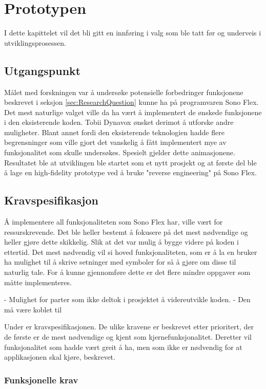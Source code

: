 \chapter{Prototypen} 

I dette kapittelet vil det bli gitt en innføring i valg som ble tatt før og underveis i utviklingsprosessen. 
 
\section{Utgangspunkt} 
\label{sec:utgangspunkt} 

Målet med forskningen var å undersøke potensielle forbedringer funksjonene beskrevet i seksjon \ref{sec:ResearchQuestion} kunne ha på programvaren Sono Flex. Det mest naturlige valget ville da  ha vært å implementert de ønskede funksjonene i den eksisterende koden. Tobii Dynavox ønsket derimot å utforske andre muligheter. Blant annet fordi den eksisterende teknologien hadde flere begrensninger som ville gjort det vanskelig å fått implementert mye av funksjonalitet som skulle undersøkes. Spesielt gjelder dette animasjonene. Resultatet ble at utviklingen ble startet som et nytt prosjekt og at første del ble å lage en high-fidelity prototype ved å bruke "reverse engineering" på Sono Flex.


\section{Kravspesifikasjon} 

Å implementere all funksjonaliteten som Sono Flex har, ville vært for ressurskrevende. Det ble heller bestemt å fokusere på det mest nødvendige og heller gjøre dette skikkelig. Slik at det var mulig å bygge videre på koden i ettertid. Det mest nødvendig vil si hoved funksjonaliteten, som er å la en bruker ha mulighet til å skrive setninger med symboler for så å gjøre om disse til naturlig tale. For å kunne gjennomføre dette er det flere mindre oppgaver som måtte implementeres. 

-	Mulighet for parter som ikke deltok i prosjektet å videreutvikle koden.
-	Den må være koblet til 

Under er kravspesifikasjonen. De ulike kravene er beskrevet etter prioritert, der de første er de mest nødvendige og kjent som kjernefunksjonalitet. Deretter vil funksjonalitet som hadde vært greit å ha, men som ikke er nødvendig for at applikasjonen skal kjøre, beskrevet.  
 
\subsection{Funksjonelle krav} 
 
